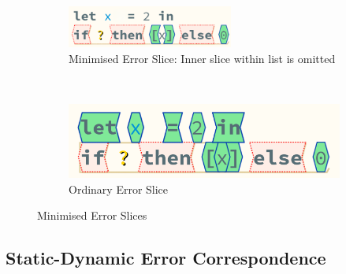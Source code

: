 \begin{figure}[h]
\centering
\begin{subfigure}[t]{0.5\textwidth}
\centering

\includegraphics[width=0.6\textwidth]{Media/Figures/partially_inconsistent_compound}
\caption{Minimised Error Slice: Inner  slice within list is omitted}
\end{subfigure}$\qquad\qquad$
\begin{subfigure}[t]{0.3\textwidth}
\centering

\includegraphics[width=1\textwidth]{Media/Figures/partially_inconsistent_compound_ordinary}
\caption{Ordinary Error Slice}
\end{subfigure}

\caption{Minimised Error Slices}
\label{fig:MinimisedSlice}
\end{figure}


  
\subsection{Static-Dynamic Error Correspondence}
\label{sec:ErrorCorrespondence}

